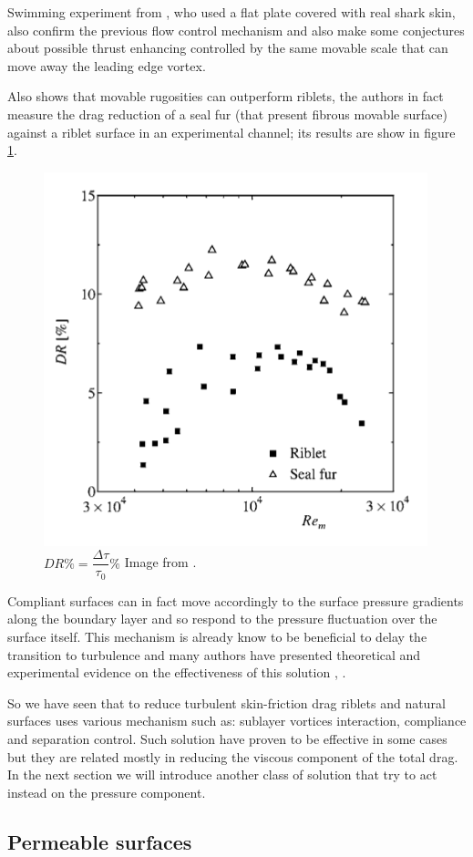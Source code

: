 Swimming experiment from \citet{Oeffner785}, who used a flat plate covered with real shark skin, also confirm the previous flow control mechanism and also make some conjectures about possible thrust enhancing controlled by the same movable scale that can move away the leading edge vortex.

Also \citet{itoh2006turbulent} shows that movable rugosities can outperform riblets, the authors in fact measure the drag reduction of a seal fur (that present fibrous movable surface) against a riblet surface in an experimental channel; its results are show in figure \ref{fig:seal}.

\begin{figure}[h]
\centering
\includegraphics[width=0.5\linewidth]{chapter_1/seal}
\caption{$DR \% = \dfrac{ \Delta \tau}{\tau_{0}} \%$ Image from \citet{itoh2006turbulent}.}
\label{fig:seal}
\end{figure}


Compliant surfaces can in fact move accordingly to the surface pressure gradients along the boundary layer and so respond to the pressure fluctuation over the surface itself.
This mechanism is already know to be beneficial to delay the transition to turbulence and many authors have presented theoretical and experimental evidence on the effectiveness of this solution \citet{carpenter1990status}, \citet{bushnell1977effect}.

So we have seen that to reduce turbulent skin-friction drag riblets and natural surfaces uses various mechanism such as: sublayer vortices interaction, compliance and separation control.
Such solution have proven to be effective in some cases but they are related mostly in reducing the viscous component of the total drag.
In the next section we will introduce another class of solution that try to act instead on the pressure component.


\subsection{Permeable surfaces}

